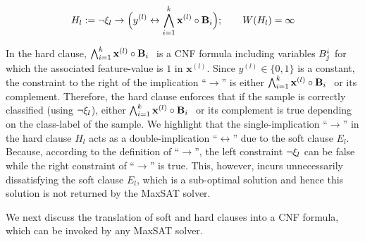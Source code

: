 \begin{itemize}
	\begin{equation}
			\label{interpretability_imli_hard_clause_rule_consistency}
		H_l:= \neg \xi_l \rightarrow \Big(y^{(l)}\leftrightarrow \bigwedge_{i=1}^k {\mathbf{x}^{(l)}} \circ {\ensuremath{\mathbf{B}}_{i}}\Big); \qquad  W \! \left( H_l \right)=\infty
	\end{equation}
	
	In the hard clause, $ \bigwedge_{i=1}^k {\mathbf{x}^{(l)}} \circ {\ensuremath{\mathbf{B}}_{i}}\ $ is a CNF formula including variables $ B_j^i $ for which the associated  feature-value is $ 1 $ in  $ \mathbf{x}^{(l)} $. Since $ y^{(l)} \in \{0,1\} $ is a constant, the constraint to the right of the implication ``$ \rightarrow $'' is either  $ \bigwedge_{i=1}^k {\mathbf{x}^{(l)}} \circ {\ensuremath{\mathbf{B}}_{i}}\ $ or its complement. Therefore, the hard clause enforces that if the sample is correctly classified (using $ \neg \xi_l $), either  $ \bigwedge_{i=1}^k {\mathbf{x}^{(l)}} \circ {\ensuremath{\mathbf{B}}_{i}}\ $ or its complement is true depending on the class-label of the sample.  We highlight that  the single-implication ``$ \rightarrow $'' in the hard clause $ H_l $ acts as a double-implication ``$ \leftrightarrow $''  due to the soft clause $ E_l $. Because, according to the definition of ``$ \rightarrow $'', the left constraint $ \neg \xi_l $ can  be false while the right constraint of 	``$ \rightarrow $'' is true.  This, however, incurs unnecessarily dissatisfying the soft clause $ E_l $, which is a sub-optimal solution and hence this solution is not returned by the MaxSAT solver. 
	
	

	


\end{itemize}

	  We next discuss the translation of soft and hard clauses into a CNF formula, which can be invoked by any MaxSAT solver. 

